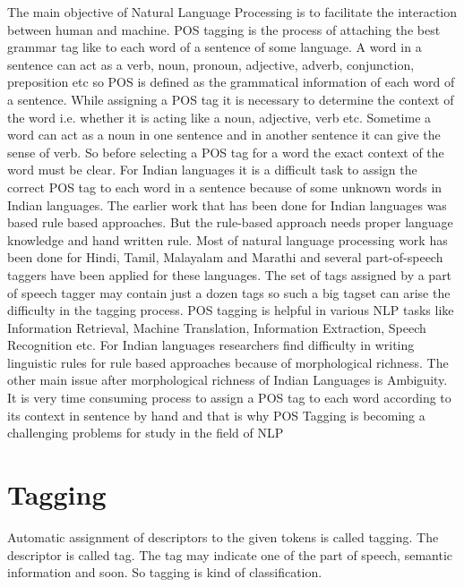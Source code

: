 \documentclass[12pt,a4paper,oneside]{memoir}
\begin{document}
The main objective of Natural Language Processing is to facilitate the interaction between human and machine. POS tagging is the process of attaching the best grammar tag like to each word of a sentence of some language. A word in a sentence can act as a verb, noun, pronoun, adjective, adverb, conjunction, preposition etc so POS is defined as the grammatical information of each word of a sentence. While assigning a POS tag it is necessary to determine the context of the word i.e. whether it is acting like a noun, adjective, verb etc. Sometime a word can act as a noun in one sentence and in another sentence it can give the sense of verb. So before selecting a POS tag for a word the exact context of the word must be clear. For Indian languages it is a difficult task to assign the correct POS tag to each word in a sentence because of some unknown words in Indian languages. The earlier work that has been done for Indian languages was based rule based approaches. But the rule-based approach needs proper language knowledge and hand written rule. Most of natural language processing work has been done for Hindi, Tamil, Malayalam and Marathi and several part-of-speech taggers have been applied for these languages. The set of tags assigned by a part of speech tagger may contain just a dozen tags so such a big tagset can arise the difficulty in the tagging process. POS tagging is helpful in various NLP tasks like Information Retrieval, Machine Translation, Information Extraction, Speech Recognition etc. For Indian languages researchers find difficulty in writing linguistic rules for rule based approaches because of morphological richness. The other main issue after morphological richness of Indian Languages is Ambiguity. It is very time consuming process to assign a POS tag to each word according to its context in sentence by hand and that is why POS Tagging is becoming a challenging problems for study in the field of NLP

\section{Tagging}
Automatic assignment of descriptors to the given tokens is called tagging. The descriptor is called tag. The tag may indicate one of the part of speech, semantic information and soon. So tagging is kind of classification. 
\end{document}
